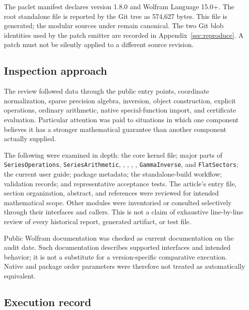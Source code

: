 The paclet manifest declares version 1.8.0 and Wolfram Language 15.0+. The root standalone file is reported by the Git tree as 574,627 bytes. This file is generated; the modular sources under  remain canonical. The two Git blob identities used by the patch emitter are recorded in Appendix~\ref{sec:reproduce}. A patch must not be silently applied to a different source revision.\cite{paclet,tree,development}

\subsection{Inspection approach}

The review followed data through the public entry points, coordinate normalization, sparse precision algebra, inversion, object construction, explicit operations, ordinary arithmetic, native special-function import, and certificate evaluation. Particular attention was paid to situations in which one component believes it has a stronger mathematical guarantee than another component actually supplied.

The following were examined in depth: the core kernel file; major parts of \texttt{SeriesOperations}, \texttt{SeriesArithmetic}, , , , , \texttt{GammaInverse}, and \texttt{FlatSectors}; the current user guide; package metadata; the standalone-build workflow; validation records; and representative acceptance tests. The article's entry file, section organization, abstract, and references were reviewed for intended mathematical scope. Other modules were inventoried or consulted selectively through their interfaces and callers. This is not a claim of exhaustive line-by-line review of every historical report, generated artifact, or test file.\cite{core,operations,arithmetic,inverseexpressions,certificates,native,parameterized,gammainverse,flat,guide,article,acceptance}

Public Wolfram documentation was checked as current documentation on the audit date. Such documentation describes supported interfaces and intended behavior; it is not a substitute for a version-specific comparative execution. Native and package order parameters were therefore not treated as automatically equivalent.

\subsection{Execution record}

